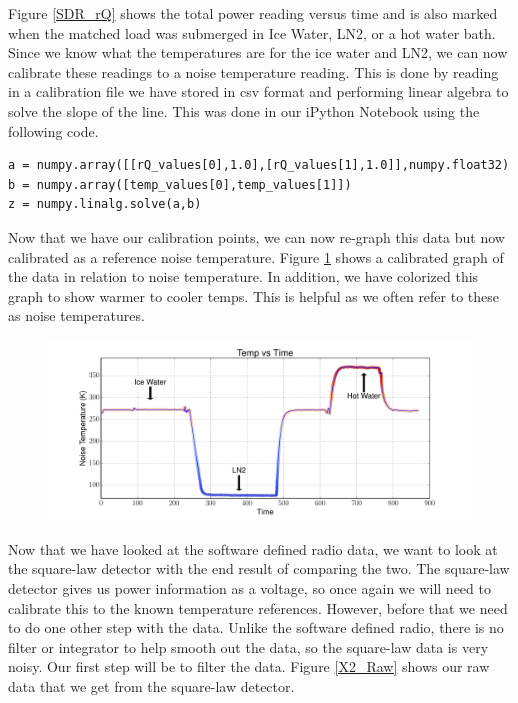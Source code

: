 {Figure \ref{SDR_rQ} shows the total power reading versus time and is also marked when the matched load was submerged in Ice Water, LN2, or a hot water bath.  Since we know what the temperatures are for the ice water and LN2, we can now calibrate these readings to a noise temperature reading.  This is done by reading in a calibration file we have stored in csv format and performing linear algebra to solve the slope of the line.  This was done in our iPython Notebook using the following code.

\lstset{language=Python}
\begin{lstlisting}[frame=single,keywordstyle=\color{blue}]
a = numpy.array([[rQ_values[0],1.0],[rQ_values[1],1.0]],numpy.float32)
b = numpy.array([temp_values[0],temp_values[1]])
z = numpy.linalg.solve(a,b)
\end{lstlisting}

Now that we have our calibration points, we can now re-graph this data but now calibrated as a reference noise temperature. Figure \ref{SDR_Calibrated} shows a calibrated graph of the data in relation to noise temperature.  In addition, we have colorized this graph to show warmer to cooler temps.  This is helpful as we often refer to these as noise temperatures.

\begin{figure}[h!tb] \centering

\includegraphics[width=\textwidth]{Experiments/Exp1/sdr_calibrated_color.pdf}

\label{SDR_Calibrated}
\end{figure}

Now that we have looked at the software defined radio data, we want to look at the square-law detector with the end result of comparing the two.  The square-law detector gives us power information as a voltage, so once again we will need to calibrate this to the known temperature references.  However, before that we need to do one other step with the data.  Unlike the software defined radio, there is no filter or integrator to help smooth out the data, so the square-law data is very noisy.  Our first step will be to filter the data.  Figure \ref{X2_Raw} shows our raw data that we get from the square-law detector.

}
